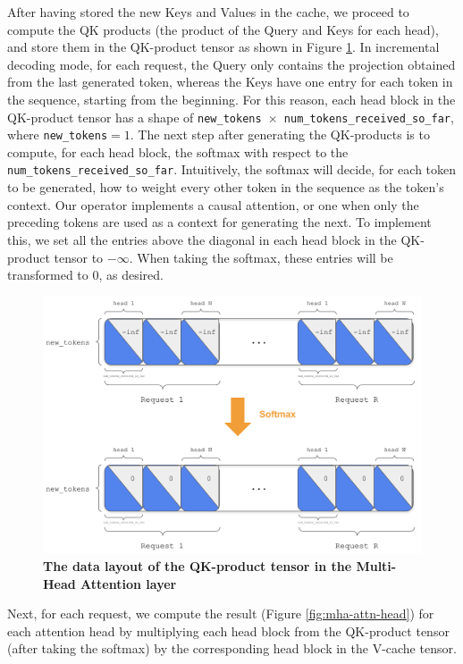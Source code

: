 After having stored the new Keys and Values in the cache, we proceed to compute the QK products (the product of the Query and Keys for each head), and store them in the QK-product tensor as shown in Figure \ref{fig:mha-qk-products}. In incremental decoding mode, for each request, the Query only contains the projection obtained from the last generated token, whereas the Keys have one entry for each token in the sequence, starting from the beginning. For this reason, each head block in the QK-product tensor has a shape of \texttt{new\_tokens $\times$ num\_tokens\_received\_so\_far}, where \texttt{new\_tokens}$=1$. The next step after generating the QK-products is to compute, for each head block, the softmax with respect to the \texttt{num\_tokens\_received\_so\_far}. Intuitively, the softmax will decide, for each token to be generated, how to weight every other token in the sequence as the token's context. Our operator implements a causal attention, or one when only the preceding tokens are used as a context for generating the next. To implement this, we set all the entries above the diagonal in each head block in the QK-product tensor to $-\infty$. When taking the softmax, these entries will be transformed to $0$, as desired.

\begin{figure}[H]
    \centering
    \includegraphics[width=\linewidth]{figures/qk_prods2.png}
    \caption{\textbf{The data layout of the QK-product tensor in the Multi-Head Attention layer}}
    \label{fig:mha-qk-products}
\end{figure}

Next, for each request, we compute the result (Figure \ref{fig:mha-attn-head}) for each attention head by multiplying each head block from the QK-product tensor (after taking the softmax) by the corresponding head block in the V-cache tensor. 

